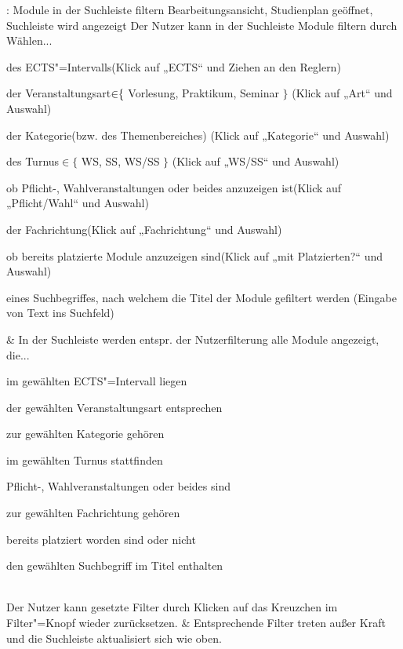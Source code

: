 \begin{usecase}{: Module in der Suchleiste filtern}
	{Bearbeitungsansicht, Studienplan geöffnet, Suchleiste wird angezeigt}
	Der Nutzer kann in der Suchleiste Module filtern durch Wählen...
	\begin{tblitemize}
		\item des ECTS"=Intervalls\opt (Klick auf „ECTS“ und Ziehen an den Reglern)
		\item der Veranstaltungsart\opt $\in\hspace{-3pt}\{$ Vorlesung, Praktikum, Seminar $\}$ (Klick auf „Art“ und Auswahl)
		\item der Kategorie\opt (bzw. des Themenbereiches) (Klick auf „Kategorie“ und Auswahl)
		\item des Turnus\opt $\in \{$ WS, SS, WS/SS $\}$ (Klick auf „WS/SS“ und Auswahl)
		\item ob Pflicht-, Wahlveranstaltungen oder beides anzuzeigen ist\opt (Klick auf „Pflicht/Wahl“ und Auswahl)
		\item der Fachrichtung\opt (Klick auf „Fachrichtung“ und Auswahl)
		\item ob bereits platzierte Module anzuzeigen sind\opt (Klick auf „mit Platzierten?“ und Auswahl)
		\item eines Suchbegriffes, nach welchem die Titel der Module gefiltert werden (Eingabe von Text ins Suchfeld)
	\end{tblitemize}
	& In der Suchleiste werden entspr. der Nutzerfilterung alle Module angezeigt, die...
	\begin{tblitemize}
		\item im gewählten ECTS"=Intervall liegen\opt
		\item der gewählten Veranstaltungsart entsprechen\opt
		\item zur gewählten Kategorie gehören\opt
		\item im gewählten Turnus stattfinden\opt
		\item Pflicht-, Wahlveranstaltungen oder beides sind\opt
		\item zur gewählten Fachrichtung gehören\opt
		\item bereits platziert worden sind oder nicht\opt
		\item den gewählten Suchbegriff im Titel enthalten
	\end{tblitemize} \\
	\hline
	Der Nutzer kann gesetzte Filter durch Klicken auf das Kreuzchen im Filter"=Knopf wieder zurücksetzen.
	& Entsprechende Filter treten außer Kraft und die Suchleiste aktualisiert sich wie oben.
\end{usecase}

